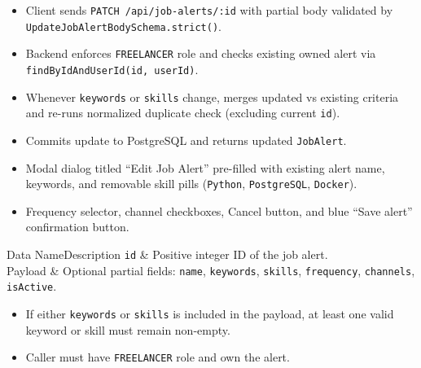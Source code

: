 \begin{itemize}[leftmargin=1.6em,topsep=3pt,itemsep=2pt,parsep=0pt,label=$\bullet$]
    \item Client sends \texttt{PATCH /api/job-alerts/:id} with partial body validated by \texttt{UpdateJobAlertBodySchema.strict()}.
    \item Backend enforces \texttt{FREELANCER} role and checks existing owned alert via \texttt{findByIdAndUserId(id, userId)}.
    \item Whenever \texttt{keywords} or \texttt{skills} change, merges updated vs existing criteria and re-runs normalized duplicate check (excluding current \texttt{id}).
    \item Commits update to PostgreSQL and returns updated \texttt{JobAlert}.
\end{itemize}

\begin{itemize}[leftmargin=1.6em,topsep=3pt,itemsep=2pt,parsep=0pt,label=$\bullet$]
    \item Modal dialog titled ``Edit Job Alert'' pre-filled with existing alert name, keywords, and removable skill pills (\texttt{Python}, \texttt{PostgreSQL}, \texttt{Docker}).
    \item Frequency selector, channel checkboxes, Cancel button, and blue ``Save alert'' confirmation button.
\end{itemize}


\begin{specdatatable}{Data Name}{Description}
\texttt{id} & Positive integer ID of the job alert.\\ \hline
Payload & Optional partial fields: \texttt{name}, \texttt{keywords}, \texttt{skills}, \texttt{frequency}, \texttt{channels}, \texttt{isActive}.\\ \hline
\end{specdatatable}

\begin{itemize}[leftmargin=1.6em,topsep=3pt,itemsep=2pt,parsep=0pt,label=$\bullet$]
    \item If either \texttt{keywords} or \texttt{skills} is included in the payload, at least one valid keyword or skill must remain non-empty.
    \item Caller must have \texttt{FREELANCER} role and own the alert.
\end{itemize}

